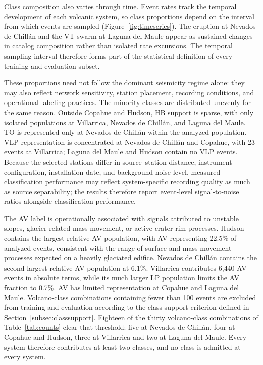 \documentclass[pdflatex,sn-mathphys-num]{sn-jnl}
\begin{document}
Class composition also varies through time. Event rates track the temporal
development of each volcanic system, so class proportions depend on the interval
from which events are sampled (Figure~\ref{fig:timeseries}). The eruption at
Nevados de Chill\'an and the VT swarm at Laguna del Maule appear as sustained
changes in catalog composition rather than isolated rate excursions. The
temporal sampling interval therefore forms part of the statistical definition of
every training and evaluation subset.



These proportions need not follow the dominant seismicity regime alone: they
may also reflect network sensitivity, station placement, recording conditions,
and operational labeling practices. The minority classes are distributed
unevenly for the same reason. Outside Copahue and Hudson, HB support is
sparse, with only isolated populations at Villarrica, Nevados de Chill\'an,
and Laguna del Maule. TO is represented only at Nevados de Chill\'an within
the analyzed population. VLP representation is concentrated at Nevados de
Chill\'an and Copahue, with 23 events at Villarrica; Laguna del Maule and
Hudson contain no VLP events. Because the selected stations differ in
source--station distance, instrument configuration, installation date, and
background-noise level, measured classification performance may reflect
system-specific recording quality as much as source separability; the results
therefore report event-level signal-to-noise ratios alongside classification
performance.

The AV label is operationally associated with signals attributed to unstable
slopes, glacier-related mass movement, or active crater-rim processes. Hudson contains the largest relative AV population, with AV representing 22.5\%
of analyzed events, consistent with the range of surface and mass-movement
processes expected on a heavily glaciated edifice. Nevados de Chill\'an contains the second-largest relative AV population
at 6.1\%. Villarrica contributes 6{,}440 AV events in absolute terms, while its
much larger LP population limits the AV fraction to 0.7\%. AV has limited
representation at Copahue and Laguna del Maule. Volcano-class combinations
containing fewer than 100 events are excluded from training and evaluation
according to the class-support criterion defined in
Section~\ref{subsec:classsupport}. Eighteen of the thirty volcano-class
combinations of Table~\ref{tab:counts} clear that threshold: five at Nevados
de Chill\'an, four at Copahue and Hudson, three at Villarrica and two at
Laguna del Maule. Every system therefore contributes at least two classes,
and no class is admitted at every system.
\end{document}
